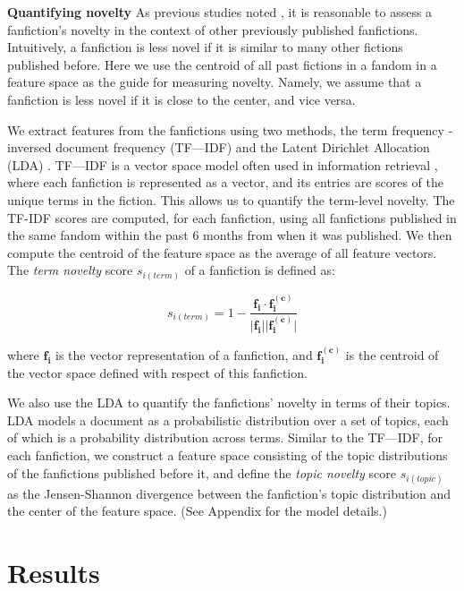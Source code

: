 \documentclass[letterpaper]{article} %
\begin{document}
\textbf{Quantifying novelty}   As previous studies noted \cite{askin2017makes,de2015game}, it is reasonable to assess a fanfiction's novelty in the context of other previously published fanfictions. Intuitively, a fanfiction is less novel if it is similar to many other fictions published before. Here we use the centroid of all past fictions in a fandom in a feature space as the guide for measuring novelty. Namely, we assume that a fanfiction is less novel if it is close to the center, and vice versa. 

We extract features from the fanfictions using two methods, the term frequency - inversed document frequency (TF---IDF) and the Latent Dirichlet Allocation (LDA) \cite{blei2003latent}. TF---IDF is a vector space model often used in information retrieval \cite{salton1988term}, where each fanfiction is represented as a vector, and its entries are scores of the unique terms in the fiction. This allows us to quantify the term-level novelty. The TF-IDF scores are computed, for each fanfiction, using all fanfictions published in the same fandom within the past 6 months from when it was published. We then compute the centroid of the feature space as the average of all feature vectors. The \emph{term novelty} score $s_{i(term)}$ of a fanfiction is defined as:

\begin{equation}
s_{i(term)} = 1-\frac{\boldsymbol{f_i} \cdot{\boldsymbol{f_i^{(c)}}}} {\lvert \boldsymbol{f_i} \rvert \lvert \boldsymbol{f_i^{(c)}} \rvert}
\end{equation}

where $\boldsymbol{f_i}$ is the vector representation of a fanfiction, and $\boldsymbol{f_i^{(c)}}$ is the centroid of the vector space defined with respect of this fanfiction.

We also use the LDA to quantify the fanfictions' novelty in terms of their topics. LDA models a document as a probabilistic distribution over a set of topics, each of which is a probability distribution across terms. Similar to the TF---IDF, for each fanfiction, we construct a feature space consisting of the topic distributions of the fanfictions published before it, and define the \emph{topic novelty} score $s_{i(topic)}$ as the Jensen-Shannon divergence between the fanfiction's topic distribution and the center of the feature space. (See Appendix for the model details.)

\section{Results}
\end{document}
